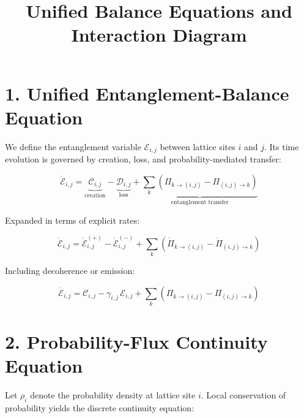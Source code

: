 \documentclass[11pt]{article}
\title{Unified Balance Equations and Interaction Diagram}
\author{}
\date{}
\begin{document}
\maketitle


\section*{1. Unified Entanglement-Balance Equation}

We define the entanglement variable $\mathcal{E}_{i,j}$ between lattice sites $i$ and $j$.
Its time evolution is governed by creation, loss, and probability-mediated transfer:



\[
\dot{\mathcal{E}}_{i,j}
=
\underbrace{\mathcal{C}_{i,j}}_{\text{creation}}
-
\underbrace{\mathcal{D}_{i,j}}_{\text{loss}}
+
\underbrace{
\sum_{k}
\left(
\Pi_{k\to (i,j)} - \Pi_{(i,j)\to k}
\right)
}_{\text{entanglement transfer}}
\]



Expanded in terms of explicit rates:



\[
\dot{\mathcal{E}}_{i,j}
=
\dot{\mathcal{E}}_{i,j}^{(+)}
-
\dot{\mathcal{E}}_{i,j}^{(-)}
+
\sum_{k}
\left(
\dot{\Pi}_{k\to (i,j)} - \dot{\Pi}_{(i,j)\to k}
\right)
\]



Including decoherence or emission:



\[
\dot{\mathcal{E}}_{i,j}
=
\mathcal{C}_{i,j}
-
\gamma_{i,j}\,\mathcal{E}_{i,j}
+
\sum_{k}
\left(
\Pi_{k\to (i,j)} - \Pi_{(i,j)\to k}
\right)
\]




\section*{2. Probability-Flux Continuity Equation}

Let $\rho_i$ denote the probability density at lattice site $i$.
Local conservation of probability yields the discrete continuity equation:
\end{document}
